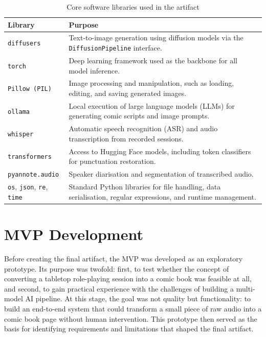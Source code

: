\begin{table}[H]
\centering
\caption{Core software libraries used in the artifact}
\label{tab:core-libraries}
\begin{tabular}{|p{3cm}|p{10cm}|}
\hline
\textbf{Library} & \textbf{Purpose} \\
\hline
\texttt{diffusers} & Text-to-image generation using diffusion models via the \texttt{DiffusionPipeline} interface. \\
\hline
\texttt{torch} & Deep learning framework used as the backbone for all model inference. \\
\hline
\texttt{Pillow (PIL)} & Image processing and manipulation, such as loading, editing, and saving generated images. \\
\hline
\texttt{ollama} & Local execution of large language models (LLMs) for generating comic scripts and image prompts. \\
\hline
\texttt{whisper} & Automatic speech recognition (ASR) and audio transcription from recorded sessions. \\
\hline
\texttt{transformers} & Access to Hugging Face models, including token classifiers for punctuation restoration. \\
\hline
\texttt{pyannote.audio} & Speaker diarisation and segmentation of transcribed audio. \\
\hline
\texttt{os}, \texttt{json}, \texttt{re}, \texttt{time} & Standard Python libraries for file handling, data serialisation, regular expressions, and runtime management. \\
\hline
\end{tabular}
\end{table}


\section{MVP Development}
Before creating the final artifact, the MVP was developed as an exploratory prototype. Its purpose was twofold: first, to test whether the concept of converting a tabletop role-playing session into a comic book was feasible at all, and second, to gain practical experience with the challenges of building a multi-model AI pipeline. At this stage, the goal was not quality but functionality: to build an end-to-end system that could transform a small piece of raw audio into a comic book page without human intervention. This prototype then served as the basis for identifying requirements and limitations that shaped the final artifact.

